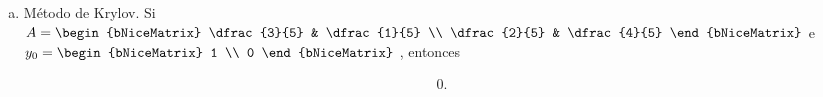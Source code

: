 \begin{frame}
	\begin{solution}
		\begin{enumerate}[c)]
			\item

			      \alert{Método de Krylov.} Si
			      \begin{math}
				      A=\begin{bNiceMatrix}
					      \dfrac{3}{5} & \dfrac{1}{5} \\
					      \dfrac{2}{5} & \dfrac{4}{5}
				      \end{bNiceMatrix}
			      \end{math} e
			      \begin{math}
				      y_{0}=
				      \begin{bNiceMatrix}
					      1 \\
					      0
				      \end{bNiceMatrix}
			      \end{math}
			      , entonces

			      \begin{align*}
				      0.
			      \end{align*}


\end{enumerate}
\end{solution}
\end{frame}
